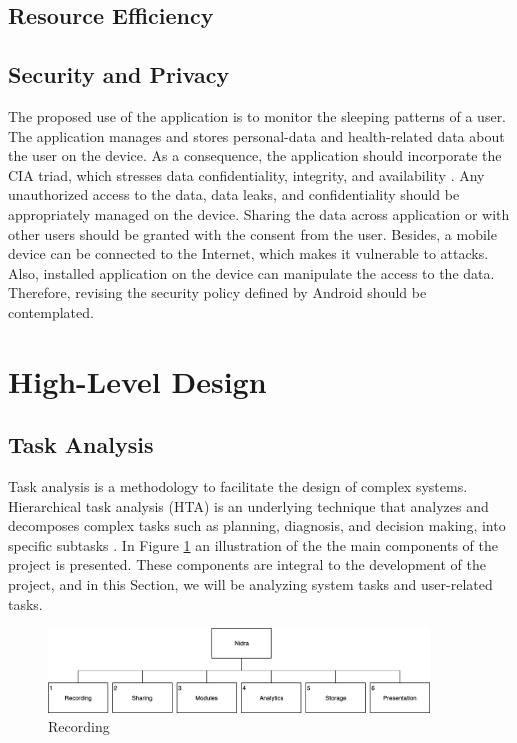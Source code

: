 \subsection{Resource Efficiency}

\subsection{Security and Privacy}
The proposed use of the application is to monitor the sleeping patterns of a user. The application manages and stores personal-data and health-related data about the user on the device. As a consequence, the application should incorporate the CIA triad, which stresses data confidentiality, integrity, and availability \cite{cia}. Any unauthorized access to the data, data leaks, and confidentiality should be appropriately managed on the device. Sharing the data across application or with other users should be granted with the consent from the user.  Besides, a mobile device can be connected to the Internet, which makes it vulnerable to attacks. Also, installed application on the device can manipulate the access to the data. Therefore, revising the security policy defined by Android \cite{androidsecurity} should be contemplated. 

\section{High-Level Design}

\subsection{Task Analysis}
Task analysis is a methodology to facilitate the design of complex systems. Hierarchical task analysis (HTA) is an underlying technique that analyzes and decomposes complex tasks such as planning, diagnosis, and decision making, into specific subtasks \cite{ta}. In Figure \ref{fig:hta_overview} an illustration of the the main components of the project is presented. These components are integral to the development of the project, and in this Section, we will be analyzing system tasks and user-related tasks.

\begin{figure}
    \centering
    \includegraphics[width=0.9\textwidth]{images/TA.png}
    \caption{Recording}
    \label{fig:hta_overview}
\end{figure}

